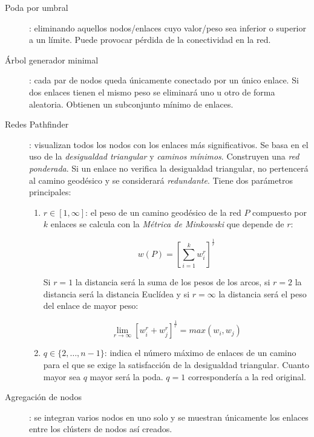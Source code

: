 \documentclass[10pt,spanish, landscape, twocolumn]{article}
\begin{document}
\begin{description}
    \item[Poda por umbral]: eliminando aquellos nodos/enlaces cuyo valor/peso sea inferior o superior a un límite. Puede provocar pérdida de la conectividad en la red.

    \item[Árbol generador minimal]: cada par de nodos queda únicamente conectado por un único enlace. Si dos enlaces tienen el mismo peso se eliminará uno u otro de forma aleatoria. Obtienen un subconjunto mínimo de enlaces.

    \item[Redes Pathfinder]: visualizan todos los nodos con los enlaces más significativos. Se basa en el uso de la \textit{\textcolor{temacuatro}{desigualdad triangular}} y \textit{\textcolor{temacuatro}{caminos mínimos}}. Construyen una \textit{\textcolor{temacuatro}{red ponderada}}. Si un enlace no verifica la desigualdad triangular, no pertencerá al camino geodésico y se considerará \textit{\textcolor{temacuatro}{redundante}}. Tiene dos parámetros principales:

    \begin{enumerate}[---]
        \item $r \in [1,\infty]$: el peso de un camino geodésico de la red $P$ compuesto por $k$ enlaces se calcula con la \textit{\textcolor{temacuatro}{Métrica de Minkowski}} que depende de $r$:

        \begin{displaymath}
            w(P) = \left[\sum_{i=1}^k w_i^r \right]^{\frac{1}{r}}
        \end{displaymath}

        Si $r = 1$ la distancia será la suma de los pesos de los arcos, si $r = 2$ la distancia será la distancia Euclídea y si $r = \infty$ la distancia será el peso del enlace de mayor peso:

        \begin{displaymath}
            \lim_{r \rightarrow \infty}[w_i^r + w_j^r]^{\frac{1}{r}} = max(w_i, w_j)
        \end{displaymath}

        \item $q \in \{2, \ldots, n-1\}$: indica el número máximo de enlaces de un camino para el que se exige la satisfacción de la desigualdad triangular. Cuanto mayor sea $q$ mayor será la poda. $q=1$ correspondería a la red original.
    \end{enumerate}

    \item[Agregación de nodos]: se integran varios nodos en uno solo y se muestran únicamente los enlaces entre los clústers de nodos así creados.
\end{description}
\end{document}
